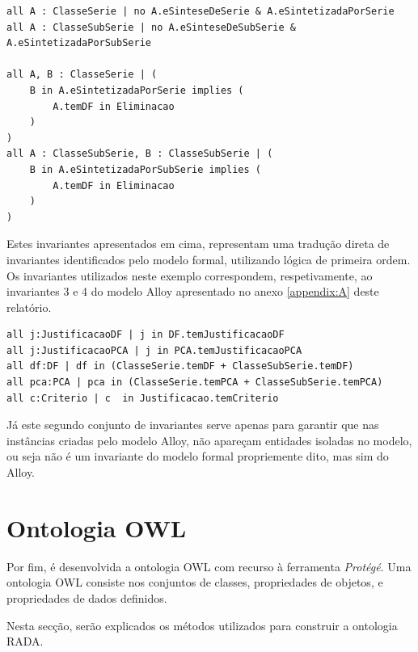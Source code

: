 \documentclass{article}
\begin{document}
\begin{lstlisting}[language=alloy, frame=single]
all A : ClasseSerie | no A.eSinteseDeSerie & A.eSintetizadaPorSerie
all A : ClasseSubSerie | no A.eSinteseDeSubSerie & A.eSintetizadaPorSubSerie

all A, B : ClasseSerie | (
    B in A.eSintetizadaPorSerie implies (
        A.temDF in Eliminacao
    )
)
all A : ClasseSubSerie, B : ClasseSubSerie | (
    B in A.eSintetizadaPorSubSerie implies (
        A.temDF in Eliminacao
    )
)
\end{lstlisting}
\par Estes invariantes apresentados em cima, representam uma tradução direta de invariantes identificados pelo modelo formal, utilizando lógica de primeira ordem. Os invariantes utilizados neste exemplo correspondem, respetivamente, ao invariantes 3 e 4 do modelo Alloy apresentado no anexo \ref{appendix:A} deste relatório.

\begin{lstlisting}[language=alloy, frame=single]
all j:JustificacaoDF | j in DF.temJustificacaoDF
all j:JustificacaoPCA | j in PCA.temJustificacaoPCA
all df:DF | df in (ClasseSerie.temDF + ClasseSubSerie.temDF)
all pca:PCA | pca in (ClasseSerie.temPCA + ClasseSubSerie.temPCA)
all c:Criterio | c  in Justificacao.temCriterio
\end{lstlisting}
\par Já este segundo conjunto de invariantes serve apenas para garantir que nas instâncias criadas pelo modelo Alloy, não apareçam entidades isoladas no modelo, ou seja não é um invariante do modelo formal propriemente dito, mas sim do Alloy.


\newpage
\section{Ontologia OWL}

Por fim, é desenvolvida a ontologia OWL com recurso à ferramenta \textit{Protégé}. Uma ontologia OWL consiste nos conjuntos de classes, propriedades de objetos, e propriedades de dados definidos.

Nesta secção, serão explicados os métodos utilizados para construir a ontologia RADA.
\end{document}
